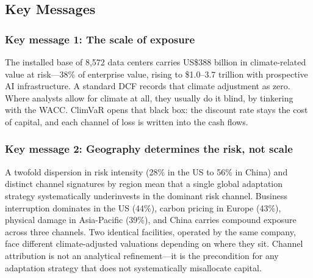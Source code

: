 \thispagestyle{chapterstart}

\subsection*{Key Messages}\label{toc:key}
\greensep

\titlespacing*{\subsubsection}{0pt}{3pt}{1pt}
\begin{twocolbody}

\subsubsection*{Key message 1: The scale of exposure}

The installed base of 8,572 data centers carries US\$388 billion in climate-related value at risk---38\% of enterprise value, rising to \$1.0--3.7 trillion with prospective AI infrastructure. A standard DCF records that climate adjustment as zero. Where analysts allow for climate at all, they usually do it blind, by tinkering with the WACC. ClimVaR opens that black box: the discount rate stays the cost of capital, and each channel of loss is written into the cash flows.

\subsubsection*{Key message 2: Geography determines the risk, not scale}

A twofold dispersion in risk intensity (28\% in the US to 56\% in China) and distinct channel signatures by region mean that a single global adaptation strategy systematically underinvests in the dominant risk channel. Business interruption dominates in the US (44\%), carbon pricing in Europe (43\%), physical damage in Asia-Pacific (39\%), and China carries compound exposure across three channels. Two identical facilities, operated by the same company, face different climate-adjusted valuations depending on where they sit. Channel attribution is not an analytical refinement---it is the precondition for any adaptation strategy that does not systematically misallocate capital.


\end{twocolbody}
